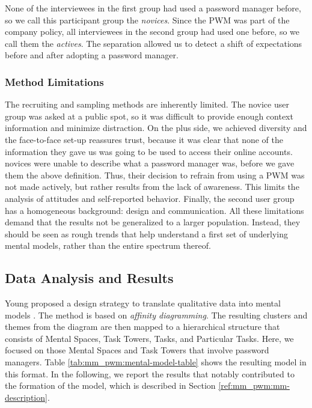 None of the interviewees in the first group had used a password manager before, so we call this participant group the \textit{novices}. Since the \gls{PWM} was part of the company policy, all interviewees in the second group had used one before, so we call them the \textit{actives}. The separation allowed us to detect a shift of expectations before and after adopting a password manager. 

\subsubsection{Method Limitations}
The recruiting and sampling methods are inherently limited. The novice user group was asked at a public spot, so it was difficult to provide enough context information and minimize distraction. On the plus side, we achieved diversity and the face-to-face set-up reassures trust, because it was clear that none of the information they gave us was going to be used to access their online accounts.  novices were unable to describe what a password manager was, before we gave them the above definition. Thus, their decision to refrain from using a \gls{PWM} was not made actively, but rather results from the lack of awareness. This limits the analysis of attitudes and self-reported behavior. Finally, the second user group has a homogeneous background: design and communication. All these limitations demand that the results not be generalized to a larger population. Instead, they should be seen as rough trends that help understand a first set of underlying mental models, rather than the entire spectrum thereof.

\subsection{Data Analysis and Results}
Young proposed a design strategy to translate qualitative data into mental models \cite{Young2008}. The method is based on \textit{affinity diagramming}. The resulting clusters and themes from the diagram are then mapped to a hierarchical structure that consists of Mental Spaces, Task Towers, Tasks, and Particular Tasks. Here, we focused on those Mental Spaces and Task Towers that involve password managers. Table \ref{tab:mm_pwm:mental-model-table} shows the resulting model in this format. In the following, we report the results that notably contributed to the formation of the model, which is described in Section \ref{ref:mm_pwm:mm-description}.

